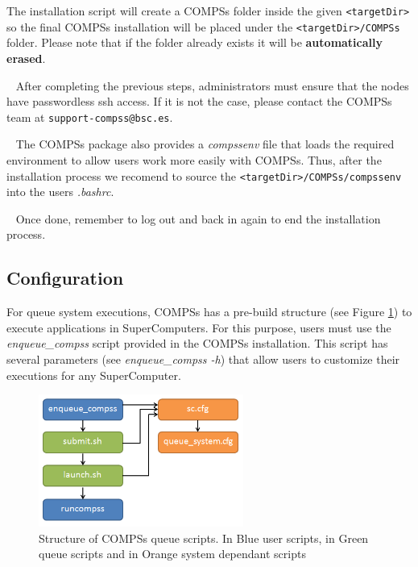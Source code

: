The installation script will create a COMPSs folder inside the given \verb|<targetDir>| so the final COMPSs installation will be placed 
under the \verb|<targetDir>/COMPSs| folder. Please note that if the folder already exists it will be \textbf{automatically erased}.

~ \newline
After completing the previous steps, administrators must ensure that the nodes have passwordless ssh access. If it is not the case,
please contact the COMPSs team at \verb|support-compss@bsc.es|.

~ \newline
The COMPSs package also provides a \textit{compssenv} file that loads the required environment to allow users work more easily
with COMPSs. Thus, after the installation process we recomend to source the \verb|<targetDir>/COMPSs/compssenv| into the 
users \textit{.bashrc}.

~ \newline
Once done, remember to log out and back in again to end the installation process.

\subsection{Configuration}
For queue system executions, COMPSs has a pre-build structure (see Figure \ref{fig:queue_scripts_structure}) to execute 
applications in SuperComputers. For this purpose, users must use the \textit{enqueue\_compss} script provided in the COMPSs installation.
This script has several parameters (see \textit{enqueue\_compss -h}) that allow users to customize their executions for any SuperComputer.

\begin{figure}[h!]
  \centering
    \includegraphics[width=0.6\textwidth]{./Sections/6_Supercomputers/Figures/queue_scripts_structure.png}
    \caption{Structure of COMPSs queue scripts. In Blue user scripts, in Green queue scripts and in Orange system dependant scripts}
    \label{fig:queue_scripts_structure}
\end{figure}

